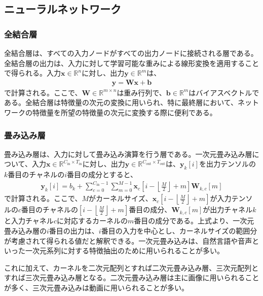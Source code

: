 \documentclass[12pt]{jarticle}
\numberwithin{equation}{section}    %
\numberwithin{figure}{section}      %
\numberwithin{table}{section}      %
\begin{document}
\subsection{ニューラルネットワーク}
\subsubsection{全結合層}
全結合層は、すべての入力ノードがすべての出力ノードに接続される層である。全結合層の出力は、入力に対して学習可能な重みによる線形変換を適用することで得られる。入力$\bm{x} \in \mathbb{R}^{n}$に対し、出力$\bm{y} \in \mathbb{R}^{m}$は、
\begin{align}
    \bm{y} = \bm{W}\bm{x} + \bm{b}
\end{align}
で計算される。ここで、$\bm{W} \in \mathbb{R}^{m \times n}$は重み行列で、$\bm{b} \in \mathbb{R}^{m}$はバイアスベクトルである。全結合層は特徴量の次元の変換に用いられ、特に最終層において、ネットワークの特徴量を所望の特徴量の次元に変換する際に便利である。

\subsubsection{畳み込み層}
畳み込み層は、入力に対して畳み込み演算を行う層である。一次元畳み込み層について、入力$\bm{x} \in \mathbb{R}^{C_{\text{in}} \times T_{\text{in}}}$に対し、出力$\bm{y} \in \mathbb{R}^{C_{\text{out}} \times T_{\text{out}}}$は、$\bm{y}_{k}[i]$を出力テンソルの$k$番目のチャネルの$i$番目の成分とすると、
\begin{align}
    \bm{y}_{k}[i] = b_{k} + \sum_{c=0}^{C_{\text{in}} - 1} \sum_{m = 0}^{M - 1} \bm{x}_{c}\left[i - \left\lfloor \frac{M}{2} \right\rfloor + m\right] \bm{W}_{k, c}[m]
\end{align}
で計算される。ここで、$M$がカーネルサイズ、$\bm{x}_{c}\left[i - \left\lfloor \frac{M}{2} \right\rfloor + m\right]$が入力テンソルの$c$番目のチャネルの$\left[i - \left\lfloor \frac{M}{2} \right\rfloor + m\right]$番目の成分、$\bm{W}_{k, c}[m]$が出力チャネル$k$と入力チャネル$c$に対応するカーネルの$m$番目の成分である。上式より、一次元畳み込み層の$i$番目の出力は、$i$番目の入力を中心とし、カーネルサイズの範囲分が考慮されて得られる値だと解釈できる。一次元畳み込みは、自然言語や音声といった一次元系列に対する特徴抽出のために用いられることが多い。

これに加えて、カーネルを二次元配列とすれば二次元畳み込み層、三次元配列とすれば三次元畳み込み層となる。二次元畳み込み層は主に画像に用いられることが多く、三次元畳み込みは動画に用いられることが多い。
\end{document}
